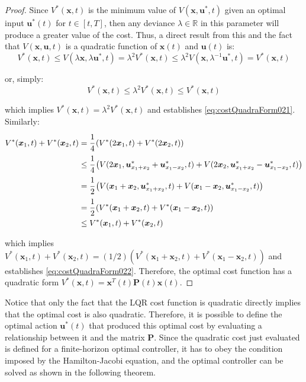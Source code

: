\documentclass[a4paper,11pt]{book}
\numberwithin{figure}{chapter}
\numberwithin{equation}{chapter}
\numberwithin{table}{chapter}
\theoremstyle{definition}
\begin{document}
\begin{proof}
	Since $V^*(\bm{x}, t)$ is the minimum value of $V(\bm{x}, \bm{u}^*, t)$ given an optimal input $\bm{u}^*(t)$ for $t \in [t, T]$, then any deviance $\lambda \in \mathbb{R}$ in this parameter will produce a greater value of the cost. Thus, a direct result from this and the fact that $V(\bm{x}, \bm{u}, t)$ is a quadratic function of $\bm{x}(t)$ and $\bm{u}(t)$ is:
	\begin{equation}
		V^*(\bm{x}, t) \leq V(\lambda \bm{x}, \lambda \bm{u}^*, t) = \lambda^2 V^*(\bm{x}, t) \leq \lambda^2 V(\bm{x}, \lambda^{-1} \bm{u}^*, t) = V^*(\bm{x}, t)
	\end{equation}
	
	\noindent or, simply:
	\begin{equation}
		V^*(\bm{x}, t) \leq \lambda^2 V^*(\bm{x}, t) \leq V^*(\bm{x}, t)
	\end{equation}
	
	\noindent which implies $V^*(\bm{x}, t) = \lambda^2 V^*(\bm{x}, t)$ and establishes \eqref{eq:costQuadraForm021}. Similarly:
	\begin{align}
	\begin{split}
		V^*(\bm{x}_1, t) + V^*(\bm{x}_2, t) &= \cfrac{1}{4} \left( V^*(2 \bm{x}_1, t) + V^*(2 \bm{x}_2, t) \right) \\
			& \leq \cfrac{1}{4} \left( V(2 \bm{x}_1, \bm{u}_{x_1+x_2}^* + \bm{u}_{x_1-x_2}^*, t) + V(2 \bm{x}_2, \bm{u}_{x_1+x_2}^* - \bm{u}_{x_1-x_2}^*, t) \right) \\
			& = \cfrac{1}{2} \left( V(\bm{x}_1 + \bm{x}_2, \bm{u}_{x_1+x_2}^*, t) + V(\bm{x}_1 - \bm{x}_2, \bm{u}_{x_1-x_2}^*, t) \right) \\
			& = \cfrac{1}{2} \left( V^*(\bm{x}_1 + \bm{x}_2, t) + V^*(\bm{x}_1 - \bm{x}_2, t) \right) \\
			& \leq V^*(\bm{x}_1, t) + V^*(\bm{x}_2, t)
	\end{split}
	\end{align}
	
	\noindent which implies $V^*(\bm{x}_1, t) + V^*(\bm{x}_2, t) = (1/2) \left( V^*(\bm{x}_1 + \bm{x}_2, t) + V^*(\bm{x}_1 - \bm{x}_2, t) \right)$ and establishes \eqref{eq:costQuadraForm022}. Therefore, the optimal cost function has a quadratic form $V^*(\bm{x}, t) = \bm{x}^T(t) \bm{P}(t) \bm{x}(t)$.
\end{proof}

Notice that only the fact that the LQR cost function is quadratic directly implies that the optimal cost is also quadratic. Therefore, it is possible to define the optimal action $\bm{u}^*(t)$ that produced this optimal cost by evaluating a relationship between it and the matrix $\bm{P}$. Since the quadratic cost just evaluated is defined for a finite-horizon optimal controller, it has to obey the condition imposed by the Hamilton-Jacobi equation, and the optimal controller can be solved as shown in the following theorem.
\end{document}
